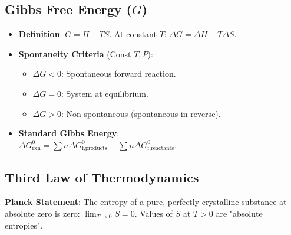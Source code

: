 \subsection{Gibbs Free Energy ($G$)}
\begin{itemize}
    \item \textbf{Definition}: $G = H - TS$. At constant $T$: $\Delta G = \Delta H - T \Delta S$.
    \item \textbf{Spontaneity Criteria} (Const $T, P$):
    \begin{itemize}
        \item $\Delta G < 0$: Spontaneous forward reaction.
        \item $\Delta G = 0$: System at equilibrium.
        \item $\Delta G > 0$: Non-spontaneous (spontaneous in reverse).
    \end{itemize}
    \item \textbf{Standard Gibbs Energy}: \\
    $\Delta G^0_{\text{rxn}} = \sum n \Delta G^0_{\text{f,products}} - \sum n \Delta G^0_{\text{f,reactants}}$.
\end{itemize}

\subsection{Third Law of Thermodynamics}
\textbf{Planck Statement}: The entropy of a pure, perfectly crystalline substance at absolute zero is zero: $\lim_{T \to 0} S = 0$. Values of $S$ at $T > 0$ are "absolute entropies".
\vspace{0.2cm}